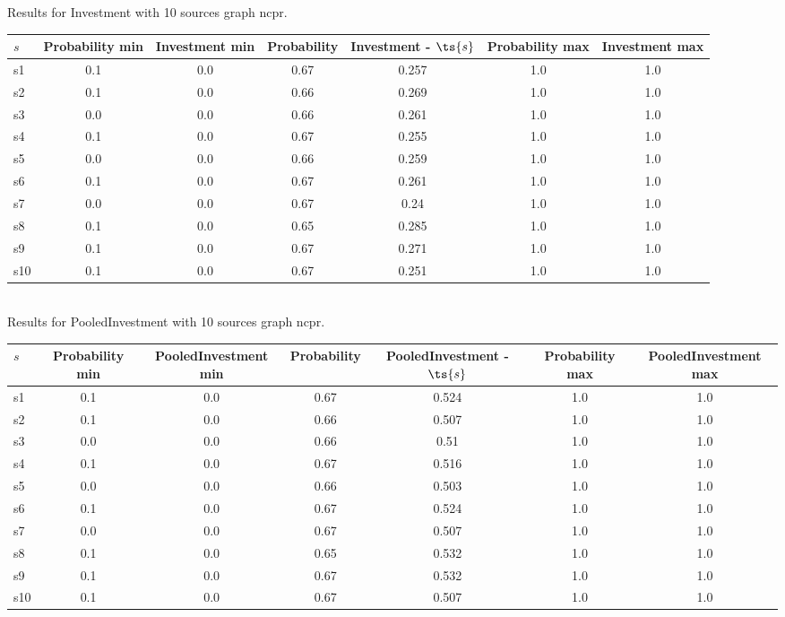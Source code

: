 \documentclass{article}
\begin{document}
\noindent Results for Investment with 10 sources graph ncpr.

\noindent\begin{tabular}{|l|c|c|c|c|c|c|}
\hline
$s$& Probability min & Investment min & Probability & Investment - $\ts{s}$ & Probability max & Investment max\\
\hline
s1 &0.1 & 0.0 & 0.67 & 0.257 & 1.0 & 1.0\\
\hline
s2 &0.1 & 0.0 & 0.66 & 0.269 & 1.0 & 1.0\\
\hline
s3 &0.0 & 0.0 & 0.66 & 0.261 & 1.0 & 1.0\\
\hline
s4 &0.1 & 0.0 & 0.67 & 0.255 & 1.0 & 1.0\\
\hline
s5 &0.0 & 0.0 & 0.66 & 0.259 & 1.0 & 1.0\\
\hline
s6 &0.1 & 0.0 & 0.67 & 0.261 & 1.0 & 1.0\\
\hline
s7 &0.0 & 0.0 & 0.67 & 0.24 & 1.0 & 1.0\\
\hline
s8 &0.1 & 0.0 & 0.65 & 0.285 & 1.0 & 1.0\\
\hline
s9 &0.1 & 0.0 & 0.67 & 0.271 & 1.0 & 1.0\\
\hline
s10 &0.1 & 0.0 & 0.67 & 0.251 & 1.0 & 1.0\\
\hline
\end{tabular}\\

\noindent Results for PooledInvestment with 10 sources graph ncpr.

\noindent\begin{tabular}{|l|c|c|c|c|c|c|}
\hline
$s$& Probability min & PooledInvestment min & Probability & PooledInvestment - $\ts{s}$ & Probability max & PooledInvestment max\\
\hline
s1 &0.1 & 0.0 & 0.67 & 0.524 & 1.0 & 1.0\\
\hline
s2 &0.1 & 0.0 & 0.66 & 0.507 & 1.0 & 1.0\\
\hline
s3 &0.0 & 0.0 & 0.66 & 0.51 & 1.0 & 1.0\\
\hline
s4 &0.1 & 0.0 & 0.67 & 0.516 & 1.0 & 1.0\\
\hline
s5 &0.0 & 0.0 & 0.66 & 0.503 & 1.0 & 1.0\\
\hline
s6 &0.1 & 0.0 & 0.67 & 0.524 & 1.0 & 1.0\\
\hline
s7 &0.0 & 0.0 & 0.67 & 0.507 & 1.0 & 1.0\\
\hline
s8 &0.1 & 0.0 & 0.65 & 0.532 & 1.0 & 1.0\\
\hline
s9 &0.1 & 0.0 & 0.67 & 0.532 & 1.0 & 1.0\\
\hline
s10 &0.1 & 0.0 & 0.67 & 0.507 & 1.0 & 1.0\\
\hline
\end{tabular}\\
\end{document}
